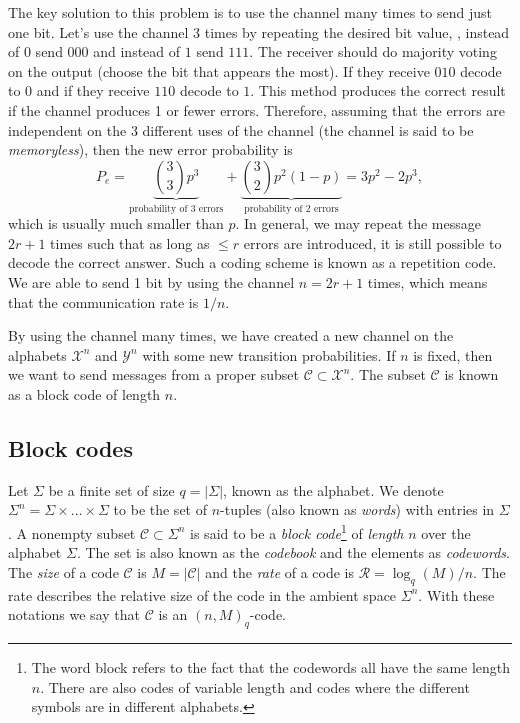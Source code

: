 \documentclass[../main.tex]{subfiles}
\begin{document}
The key solution to this problem is to use the channel many times to send just one bit. Let's use the channel 3 times by repeating the desired bit value, \ie, instead of $0$ send $000$ and instead of $1$ send $111$. The receiver should do majority voting on the output (choose the bit that appears the most). If they receive $010$ decode to $0$ and if they receive $110$ decode to $1$. This method produces the correct result if the channel produces 1 or fewer errors. Therefore, assuming that the errors are independent on the 3 different uses of the channel (the channel is said to be \emph{memoryless}), then the new error probability is
\begin{equation*}
    P_e = \underbrace{\binom{3}{3}p^3}_{\text{probability of 3 errors}} + \underbrace{\binom{3}{2}p^2 (1 - p)}_{\text{probability of 2 errors}} = 3p^2 - 2p^3,
\end{equation*}
which is usually much smaller than $p$. In general, we may repeat the message $2r + 1$ times such that as long as $\leq r$ errors are introduced, it is still possible to decode the correct answer. Such a coding scheme is known as a repetition code. We are able to send 1 bit by using the channel $n = 2r + 1$ times, which means that the communication rate is $1 / n$.

By using the channel many times, we have created a new channel on the alphabets $\mathcal{X}^n$ and $\mathcal{Y}^n$ with some new transition probabilities. If $n$ is fixed, then we want to send messages from a proper subset $\mathcal{C} \subset \mathcal{X}^n$. The subset $\mathcal{C}$ is known as a block code of length $n$.

\subsection{Block codes}

Let $\Sigma$ be a finite set of size $q = \lvert \Sigma \rvert$, known as the alphabet. We denote $\Sigma^n = \Sigma \times \dots  \times \Sigma$ to be the set of $n$-tuples (also known as \emph{words}) with entries in $\Sigma$. A nonempty subset $\mathcal{C} \subset \Sigma^n$ is said to be a \emph{block code}\footnote{The word block refers to the fact that the codewords all have the same length $n$. There are also codes of variable length and codes where the different symbols are in different alphabets.} of \emph{length} $n$ over the alphabet $\Sigma$. The set is also known as the \emph{codebook} and the elements as \emph{codewords}. The \emph{size} of a code $\mathcal{C}$ is $M = \lvert \mathcal{C} \rvert$ and the \emph{rate} of a code is $\mathcal{R} = \log_q(M) / n$. The rate describes the relative size of the code in the ambient space $\Sigma^n$. With these notations we say that $\mathcal{C}$ is an $(n, M)_q$-code.
\end{document}

